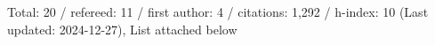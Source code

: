 Total: 20 / refereed: 11 / first author: 4 / citations: 1,292 / h-index: 10 (Last updated: 2024-12-27), List attached below